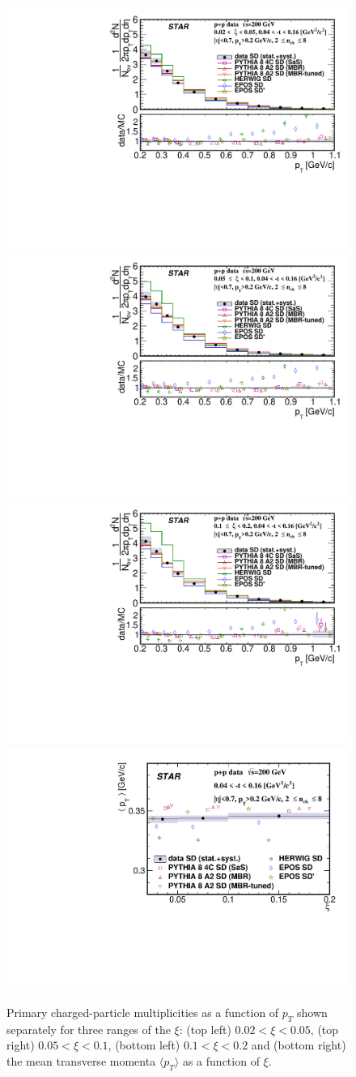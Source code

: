 \begin{figure}[h!]
	\centering
	\includegraphics[width=.49\textwidth,page=1]{chapters/chrgSTAR/img/results/out_pt_ksi_0.pdf}
	\hfill
	\includegraphics[width=.49\textwidth,page=1]{chapters/chrgSTAR/img/results/out_pt_ksi_1.pdf}
	\newline
	\includegraphics[width=.49\textwidth,page=1]{chapters/chrgSTAR/img/results/out_pt_ksi_2.pdf}
	\hfill
	\includegraphics[width=.49\textwidth,page=1]{chapters/chrgSTAR/img/results/mean_pt_xi.pdf}
	\caption[Primary charged-particle multiplicities as a function of $p_T$ shown separately for three ranges of the $\xi$ and the mean transverse momenta $\langle p_T\rangle$ as a function of $\xi$.]{Primary charged-particle multiplicities as a function of $p_T$ shown separately for three ranges of the $\xi$: (top left) $0.02<\xi<0.05$, (top right) $0.05<\xi<0.1$, (bottom left) $0.1<\xi<0.2$ and (bottom right) the mean transverse momenta $\langle p_T\rangle$ as a function of $\xi$.}
	\label{fig:results_star_pt}
\end{figure}

